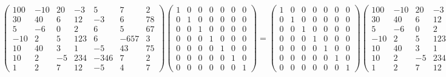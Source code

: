 \documentclass{article}%
\begin{document}
\[%
\begin{pmatrix}%
100&-10&20&-3&5&7&2\\%
30&40&6&12&-3&6&78\\%
5&-6&0&2&6&5&67\\%
-10&2&5&123&6&-657&3\\%
10&40&3&1&-5&43&75\\%
10&2&-5&234&-346&7&2\\%
1&2&7&12&-5&4&7%
\end{pmatrix} \begin{pmatrix}%
1&0&0&0&0&0&0\\%
0&1&0&0&0&0&0\\%
0&0&1&0&0&0&0\\%
0&0&0&1&0&0&0\\%
0&0&0&0&1&0&0\\%
0&0&0&0&0&1&0\\%
0&0&0&0&0&0&1%
\end{pmatrix} = \begin{pmatrix}%
1&0&0&0&0&0&0\\%
0&1&0&0&0&0&0\\%
0&0&1&0&0&0&0\\%
0&0&0&1&0&0&0\\%
0&0&0&0&1&0&0\\%
0&0&0&0&0&1&0\\%
0&0&0&0&0&0&1%
\end{pmatrix} \begin{pmatrix}%
100&-10&20&-3&5&7&2\\%
30&40&6&12&-3&6&78\\%
5&-6&0&2&6&5&67\\%
-10&2&5&123&6&-657&3\\%
10&40&3&1&-5&43&75\\%
10&2&-5&234&-346&7&2\\%
1&2&7&12&-5&4&7%
\end{pmatrix} = \begin{pmatrix}%
100&-10&20&-3&5&7&2\\%
30&40&6&12&-3&6&78\\%
5&-6&0&2&6&5&67\\%
-10&2&5&123&6&-657&3\\%
10&40&3&1&-5&43&75\\%
10&2&-5&234&-346&7&2\\%
1&2&7&12&-5&4&7%
\end{pmatrix}%
\]%
\end{document}
